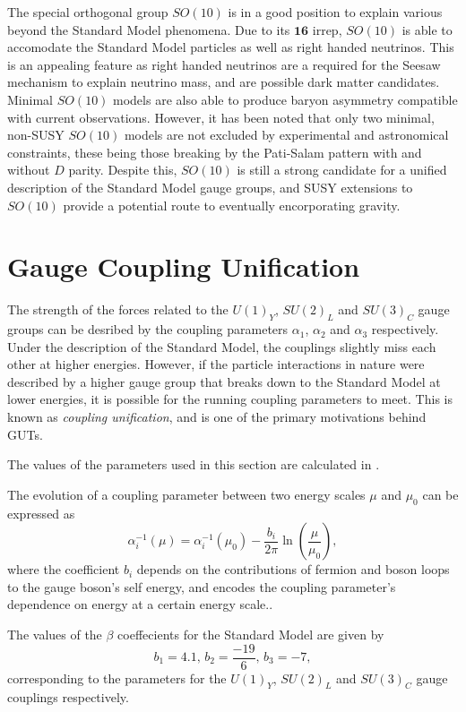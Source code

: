 \documentclass{article}
\begin{document}
The special orthogonal group $SO(10)$ is in a good position to explain various beyond the Standard Model phenomena. Due to its $\bm{16}$ irrep, $SO(10)$ is able to accomodate the Standard Model particles as well as right handed neutrinos. This is an appealing feature as right handed neutrinos are a required for the Seesaw mechanism to explain neutrino mass, and are possible dark matter candidates. Minimal $SO(10)$ models are also able to produce baryon asymmetry compatible with current observations. However, it has been noted that only two minimal, non-SUSY $SO(10)$ models are not excluded by experimental and astronomical constraints, these being those breaking by the Pati-Salam pattern with and without $D$ parity. Despite this, $SO(10)$ is still a strong candidate for a unified description of the Standard Model gauge groups, and SUSY extensions to $SO(10)$ provide a potential route to eventually encorporating gravity.

\section{Gauge Coupling Unification}%
\label{sec:CouplingUnification}
The strength of the forces related to the $U(1)_Y$, $SU(2)_L$ and $SU(3)_C$ gauge groups can be desribed by the coupling parameters $\alpha_1$, $\alpha_2$ and $\alpha_3$ respectively. Under the description of the Standard Model, the couplings slightly miss each other at higher energies. However, if the particle interactions in nature were described by a higher gauge group that breaks down to the Standard Model at lower energies, it is possible for the running coupling parameters to meet. This is known as \textit{coupling unification}, and is one of the primary motivations behind GUTs.

The values of the parameters used in this section are calculated in \cite{BetaFunction}.


\noindent The evolution of a coupling parameter between two energy scales $\mu$ and $\mu_0$ can be expressed as
\begin{equation}
\alpha^{-1}_{i}(\mu) = \alpha^{-1}_{i}(\mu_0) - \frac{b_i}{2\pi}\ln\left(\frac{\mu}{\mu_0}\right),
\end{equation}
where the coefficient $b_i$ depends on the contributions of fermion and boson loops to the gauge boson's self energy, and encodes the coupling parameter's dependence on energy at a certain energy scale..

The values of the $\beta$ coeffecients for the Standard Model are given by
\begin{equation}
b_1 = 4.1,\,b_2 = \frac{-19}{6},\,b_3 = -7,
\end{equation}
corresponding to the parameters for the $U(1)_Y$, $SU(2)_L$ and $SU(3)_C$ gauge couplings respectively.
\end{document}
